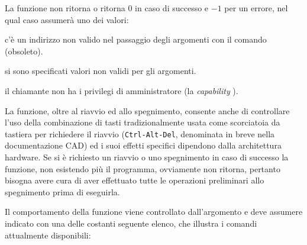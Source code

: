 \begin{funcproto}{
}

{La funzione non ritorna o ritorna $0$ in caso di successo e $-1$ per un
  errore, nel qual caso  assumerà uno dei valori:
  \begin{errlist}
  \item[\errcode{EFAULT}] c'è un indirizzo non valido nel passaggio degli
    argomenti con il comando  (obsoleto).
  \item[\errcode{EINVAL}] si sono specificati valori non validi per gli
    argomenti.
  \item[\errcode{EPERM}] il chiamante non ha i privilegi di amministratore (la
    \textit{capability} ).
  \end{errlist}
}  
\end{funcproto}

La funzione, oltre al riavvio ed allo spegnimento, consente anche di
controllare l'uso della combinazione di tasti tradizionalmente usata come
scorciatoia da tastiera per richiedere il riavvio (\texttt{Ctrl-Alt-Del},
denominata in breve nella documentazione CAD) ed i suoi effetti specifici
dipendono dalla architettura hardware. Se si è richiesto un riavvio o uno
spegnimento in caso di successo la funzione, non esistendo più il programma,
ovviamente non ritorna, pertanto bisogna avere cura di aver effettuato tutte
le operazioni preliminari allo spegnimento prima di eseguirla.

Il comportamento della funzione viene controllato dall'argomento 
e deve assumere indicato con una delle costanti seguente elenco, che
illustra i comandi attualmente disponibili:

